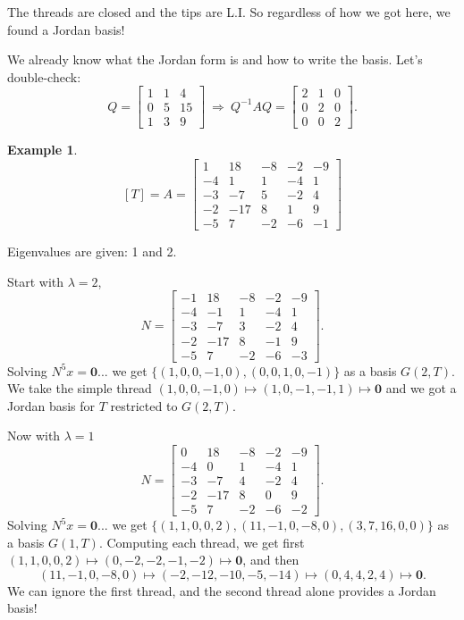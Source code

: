 \documentclass[11pt]{article}
\newcommand{\1}{\mathbf{1}}
\newcommand{\0}{\mathbf{0}}
\theoremstyle{definition}
\newtheorem{example}{Example}
\begin{document}
The threads are closed and the tips are L.I.
So regardless of how we got here, we found a Jordan basis!

We already know what the Jordan form is and how to write the basis.
Let's double-check:
\[
Q=
\begin{bmatrix}
1 & 1 & 4 \\
0 & 5 & 15 \\
1 & 3 & 9
\end{bmatrix}
\
\Longrightarrow
\
Q^{-1}AQ = 
\left[
\begin{array}{rr|r}
2 & 1 & 0 \\
0 & 2 & 0 \\
\hline
0 & 0 & 2
\end{array}
\right]
.
\]

\clearpage

\begin{example}
\[
[T] =
A=
\left[\begin{matrix}1 & 18 & -8 & -2 & -9\\-4 & 1 & 1 & -4 & 1\\-3 & -7 & 5 & -2 & 4\\-2 & -17 & 8 & 1 & 9\\-5 & 7 & -2 & -6 & -1\end{matrix}\right]
\]
\end{example}

Eigenvalues are given: 1 and 2.

Start with $\lambda=2$,
\[
N=
\left[\begin{matrix}-1 & 18 & -8 & -2 & -9\\-4 & -1 & 1 & -4 & 1\\-3 & -7 & 3 & -2 & 4\\-2 & -17 & 8 & -1 & 9\\-5 & 7 & -2 & -6 & -3\end{matrix}\right]
.
\]
Solving $N^5 x = \0$... we get $ \{(1,0,0,-1,0),(0,0,1,0,-1)\} $ as a basis $G(2,T)$.
We take the simple thread $ (1,0,0,-1,0) \mapsto (1,0,-1,-1,1) \mapsto \0 $ and we got a Jordan basis for $T$ restricted to $G(2,T)$.

Now with $\lambda=1$
\[
N=
\left[\begin{matrix}0 & 18 & -8 & -2 & -9\\-4 & 0 & 1 & -4 & 1\\-3 & -7 & 4 & -2 & 4\\-2 & -17 & 8 & 0 & 9\\-5 & 7 & -2 & -6 & -2\end{matrix}\right]
.
\]
Solving $N^5 x = \0$... we get $ \{( 1, 1, 0, 0, 2 ), ( 11, -1, 0, -8, 0 ), ( 3, 7, 16, 0, 0 )\} $ as a basis $G(1,T)$.
Computing each thread, we get first $( 1, 1, 0, 0, 2 ) \mapsto (0,-2,-2,-1,-2) \mapsto \0 $, and then
\[
(11,-1,0,-8,0)
\mapsto
(-2,-12,-10,-5,-14)
\mapsto
(0,4,4,2,4)
\mapsto
\0
.
\]
We can ignore the first thread, and the second thread alone provides a Jordan basis!
\end{document}
